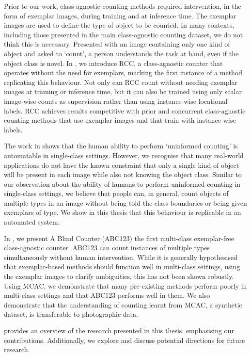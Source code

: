 \documentclass[../thesis.tex]{subfiles}
\begin{document}
Prior to our work, class-agnostic counting methods required intervention, in the form of exemplar images, during training and at inference time. The exemplar images are used to define the type of object to be counted.
In many contexts, including those presented in the main class-agnostic counting dataset, we do not think this is necessary.
Presented with an image containing only one kind of object and asked to `count', a person understands the task at hand, even if the object class is novel. 
In \textbf{}, we introduce RCC, a class-agnostic counter that operates without the need for exemplars, marking the first instance of a method replicating this behaviour.
Not only can RCC count without needing exemplar images at training or inference time, but it can also be trained using only scalar image-wise counts as supervision rather than using instance-wise locational labels. 
RCC achieves results competitive with prior and concurrent class-agnostic counting methods that use exemplar images and that train with instance-wise labels.

The work in  shows that the human ability to perform `uninformed counting' is automatable in single-class settings.
However, we recognise that many real-world applications do not have the known constraint that only a single kind of object will be present in each image while also not knowing the object class.
Similar to our observation about the ability of humans to perform uninformed counting in single-class settings, we believe that people can, in general, count objects of multiple types in an image without being told the class boundaries or being given exemplars of type.
We show in this thesis that this behaviour is replicable in an automated system.


In \textbf{}, we present A Blind Counter (ABC123) the first multi-class exemplar-free class-agnostic counter. 
ABC123 can count instances of multiple types simultaneously without human intervention.
While it is generally hypothesised that exemplar-based methods should function well in multi-class settings, using the exemplar images to clarify ambiguities, this has not been shown robustly.
Using MCAC, we demonstrate that many pre-existing methods perform poorly in multi-class settings and that ABC123 performs well in them.
We also demonstrate that the understanding of counting learnt from MCAC, a synthetic dataset, is transferable to photographic data.


\textbf{} provides an overview of the research presented in this thesis, emphasising our contributions. Additionally, we explore and discuss potential directions for future research.
\end{document}
